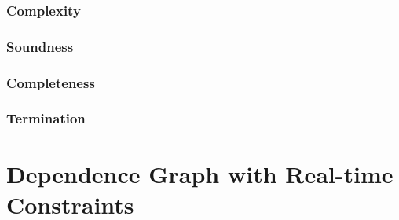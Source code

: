 \subsubsection{Complexity}

\subsubsection{Soundness}

\subsubsection{Completeness}

\subsubsection{Termination}

\section{Dependence Graph with Real-time Constraints}




